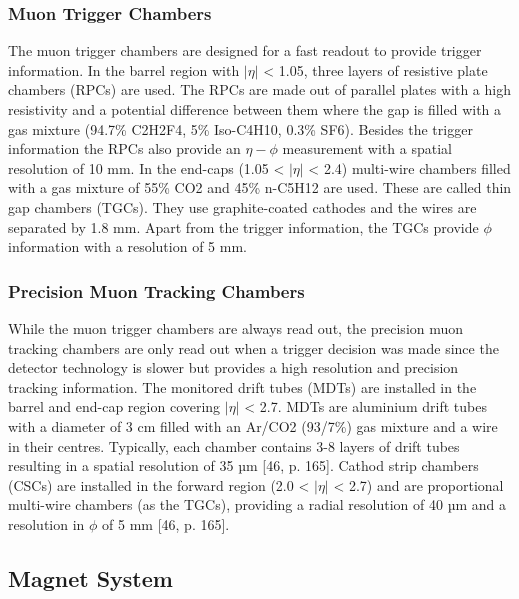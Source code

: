 
\subsubsection*{Muon Trigger Chambers}

The muon trigger chambers are designed for a fast readout to provide trigger information. In the barrel region with $|\eta|$ < 1.05, three layers of resistive plate chambers (RPCs) are used. The RPCs are made out of parallel plates with a high resistivity and a potential difference between them where the gap is filled with a gas mixture (94.7\% C2H2F4, 5\% Iso-C4H10, 0.3\% SF6). Besides the trigger information the RPCs also provide an $\eta-\phi$ measurement with a spatial resolution of 10 mm. In the end-caps (1.05 < $|\eta|$ < 2.4) multi-wire chambers filled with a gas mixture of 55\% CO2 and 45\% n-C5H12 are used. These are called thin gap chambers (TGCs). They use graphite-coated cathodes and the wires are separated by 1.8 mm. Apart from the trigger information, the TGCs provide $\phi$ information with a resolution of 5 mm.

\subsubsection*{Precision Muon Tracking Chambers}

While the muon trigger chambers are always read out, the precision muon tracking chambers are
only read out when a trigger decision was made since the detector technology is slower but provides a high resolution and precision tracking information. The monitored drift tubes (MDTs) are installed in the barrel and end-cap region covering $|\eta|$ < 2.7. MDTs are aluminium drift tubes with a diameter of 3 cm filled with an Ar/CO2 (93/7\%) gas mixture and a wire in their centres. Typically, each chamber contains 3-8 layers of drift tubes resulting in a spatial resolution of 35 µm [46, p. 165]. Cathod strip chambers (CSCs) are installed in the forward region (2.0 < $|\eta|$ < 2.7) and are proportional multi-wire chambers (as the TGCs), providing a radial resolution of 40 µm and a resolution in $\phi$ of 5 mm [46, p. 165].


\subsection{Magnet System}

